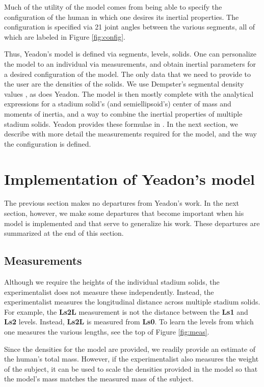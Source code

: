 \documentclass[10pt]{article}
\begin{document}
Much of the utility of the model comes from being able to specify the
configuration of the human in which one desires its inertial properties. The
configuration is specified via 21 joint angles between the various segments,
all of which are labeled in Figure \ref{fig:config}.

Thus, Yeadon's model is defined via segments, levels, solids. One can
personalize the model to an individual via measurements, and obtain inertial
parameters for a desired configuration of the model. The only data that we need
to provide to the user are the densities of the solids. We use Dempster's
segmental density values \cite{Dempster1955}, as does Yeadon. The model is then
mostly complete with the analytical expressions for a stadium solid's (and semiellipsoid's) center of
mass and moments of inertia, and a way to combine the inertial properties of
multiple stadium solids. Yeadon provides these formulae in \cite{Yeadon1990f}.
In the next section, we describe with more detail the measurements required for
the model, and the way the configuration is defined.


\section*{Implementation of Yeadon's model}

The previous section makes no departures from Yeadon's work. In the next
section, however, we make some departures that become important when his model
is implemented and that serve to generalize his work. These departures are
summarized at the end of this section.

\subsection*{Measurements}

Although we require the heights of the individual stadium solids, the
experimentalist does not measure these independently. Instead, the
experimentalist measures the longitudinal distance across multiple stadium
solids. For example, the \textbf{Ls2L} measurement is not the distance between
the \textbf{Ls1} and \textbf{Ls2} levels. Instead, \textbf{Ls2L} is measured
from \textbf{Ls0}. To learn the levels from which one measures the various
lengths, see the top of Figure \ref{fig:meas}.

Since the densities for the model are provided, we readily provide an estimate
of the human's total mass. However, if the experimentalist also measures the
weight of the subject, it can be used to scale the densities provided in the
model so that the model's mass matches the measured mass of the subject.
\end{document}
